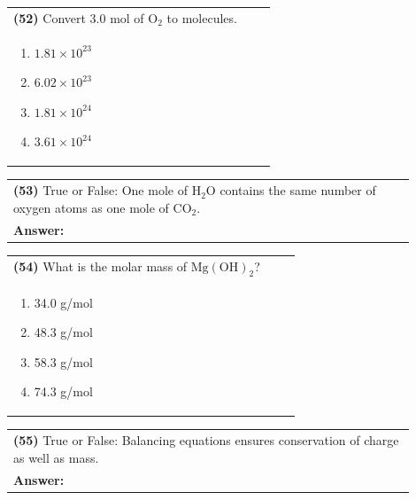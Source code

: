 \documentclass{article}
\begin{document}
{\vspace{0.2cm}
\noindent \begin{tabular}{|p{0.9\linewidth}|}
\hline
\vspace{0.2cm}
\textbf{(52)} Convert 3.0 mol of $\mathrm{O_2}$ to molecules.\\
\begin{minipage}[t]{0.85\linewidth}
\begin{enumerate}[label=\alph*.]
\item $1.81\times10^{23}$
\item $6.02\times10^{23}$
\item $1.81\times10^{24}$
\item $3.61\times10^{24}$
\end{enumerate}
\end{minipage}\\
\hline
\end{tabular}
\newpage

\vspace{0.2cm}
\noindent \begin{tabular}{|p{0.9\linewidth}|}
\hline
\vspace{0.2cm}
\textbf{(53)} True or False: One mole of $\mathrm{H_2O}$ contains the same number of oxygen atoms as one mole of $\mathrm{CO_2}$.\\
\textbf{Answer:} \underline{\hspace{2cm}}\\
\hline
\end{tabular}

\vspace{0.2cm}
\noindent \begin{tabular}{|p{0.9\linewidth}|}
\hline
\vspace{0.2cm}
\textbf{(54)} What is the molar mass of $\mathrm{Mg(OH)_2}$?\\
\begin{minipage}[t]{0.85\linewidth}
\begin{enumerate}[label=\alph*.]
\item 34.0 g/mol
\item 48.3 g/mol
\item 58.3 g/mol
\item 74.3 g/mol
\end{enumerate}
\end{minipage}\\
\hline
\end{tabular}

\vspace{0.2cm}
\noindent \begin{tabular}{|p{0.9\linewidth}|}
\hline
\vspace{0.2cm}
\textbf{(55)} True or False: Balancing equations ensures conservation of charge as well as mass.\\
\textbf{Answer:} \underline{\hspace{2cm}}\\
\hline
\end{tabular}

}
\end{document}
